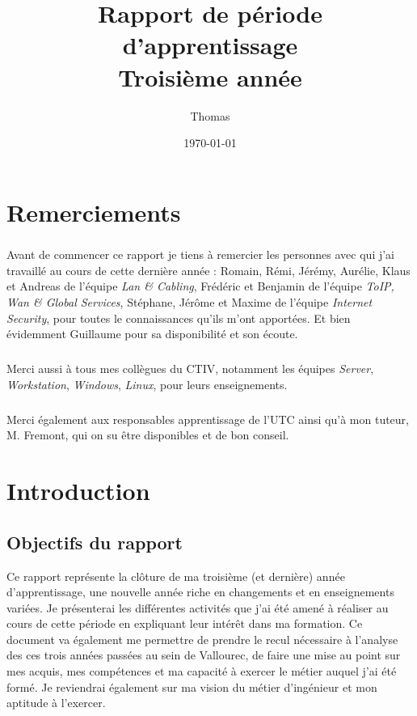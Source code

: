 \documentclass[a4paper,12pt]{report}
\title{\textbf{Rapport de période d'apprentissage} \\Troisième année}
\author{Thomas \bsc{kieffer}}
\date{\today}
\begin{document}
\stagepdtitre
\restoregeometry
\onehalfspacing
\tableofcontents

\chapter{Remerciements}
\paragraph{}
Avant de commencer ce rapport je tiens à remercier les personnes avec qui j'ai travaillé au cours de cette dernière année : Romain, Rémi, Jérémy, Aurélie, Klaus et Andreas de l'équipe \textit{Lan \& Cabling}, Frédéric et Benjamin de l'équipe \textit{ToIP, Wan \& Global Services}, Stéphane, Jérôme et Maxime de l'équipe \textit{Internet Security}, pour toutes le connaissances qu'ils m'ont apportées. Et bien évidemment Guillaume pour sa disponibilité et son écoute.

\paragraph{}
Merci aussi à tous mes collègues du CTIV, notamment les équipes \textit{Server}, \textit{Workstation}, \textit{Windows}, \textit{Linux}, pour leurs enseignements.

\paragraph{}
Merci également aux responsables apprentissage de l'UTC  ainsi qu'à mon tuteur, M. Fremont, qui on su être disponibles et de bon conseil.

\chapter{Introduction}
\section{Objectifs du rapport}
Ce rapport représente la clôture de ma troisième (et dernière) année d'apprentissage, une nouvelle année riche en changements et en enseignements variées. Je présenterai les différentes activités que j'ai été amené à réaliser au cours de cette période en expliquant leur intérêt dans ma formation. Ce document va également me permettre de prendre le recul nécessaire à l'analyse des ces trois années passées au sein de Vallourec, de faire une mise au point sur mes acquis, mes compétences et ma capacité à exercer le métier auquel j'ai été formé. Je reviendrai également sur ma vision du métier d'ingénieur et mon aptitude à l'exercer.
\end{document}
